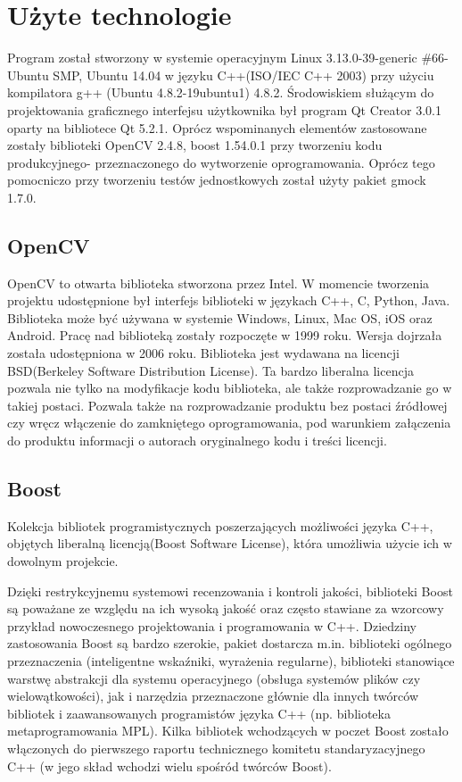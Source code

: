 \documentclass[eng,printmode]{mgr}
\begin{document}
\section{Użyte technologie}

Program został stworzony w systemie operacyjnym Linux 3.13.0-39-generic \#66-Ubuntu SMP, Ubuntu 14.04 w języku C++(ISO/IEC C++ 2003) przy użyciu kompilatora g++ (Ubuntu 4.8.2-19ubuntu1) 4.8.2. Środowiskiem służącym do projektowania graficznego interfejsu użytkownika był program Qt Creator 3.0.1 oparty na bibliotece Qt 5.2.1. Oprócz wspominanych elementów zastosowane zostały biblioteki OpenCV 2.4.8, boost 1.54.0.1 przy tworzeniu kodu produkcyjnego- przeznaczonego do wytworzenie oprogramowania. Oprócz tego pomocniczo przy tworzeniu testów jednostkowych został użyty pakiet gmock 1.7.0.
\subsection{OpenCV}

OpenCV to otwarta biblioteka stworzona przez Intel. W momencie tworzenia projektu udostępnione był interfejs biblioteki w językach C++, C, Python, Java. Biblioteka może być używana w systemie Windows, Linux, Mac OS, iOS oraz Android. Pracę nad biblioteką zostały rozpoczęte w 1999 roku. Wersja dojrzała została udostępniona w 2006 roku. Biblioteka jest wydawana na licencji BSD(Berkeley Software Distribution License). Ta bardzo liberalna licencja pozwala nie tylko na modyfikacje kodu biblioteka, ale także rozprowadzanie go w takiej postaci. Pozwala także na rozprowadzanie produktu bez postaci źródłowej czy wręcz włączenie do zamkniętego oprogramowania, pod warunkiem załączenia do produktu informacji o autorach oryginalnego kodu i treści licencji.
\subsection{Boost}

Kolekcja bibliotek programistycznych poszerzających możliwości języka C++, objętych liberalną licencją(Boost Software License), która umożliwia użycie ich w dowolnym projekcie.

Dzięki restrykcyjnemu systemowi recenzowania i kontroli jakości, biblioteki Boost są poważane ze względu na ich wysoką jakość oraz często stawiane za wzorcowy przykład nowoczesnego projektowania i programowania w C++. Dziedziny zastosowania Boost są bardzo szerokie, pakiet dostarcza m.in. biblioteki ogólnego przeznaczenia (inteligentne wskaźniki, wyrażenia regularne), biblioteki stanowiące warstwę abstrakcji dla systemu operacyjnego (obsługa systemów plików czy wielowątkowości), jak i narzędzia przeznaczone głównie dla innych twórców bibliotek i zaawansowanych programistów języka C++ (np. biblioteka metaprogramowania MPL). Kilka bibliotek wchodzących w poczet Boost zostało włączonych do pierwszego raportu technicznego komitetu standaryzacyjnego C++ (w jego skład wchodzi wielu spośród twórców Boost)\cite{wikiboost}.
\end{document}
